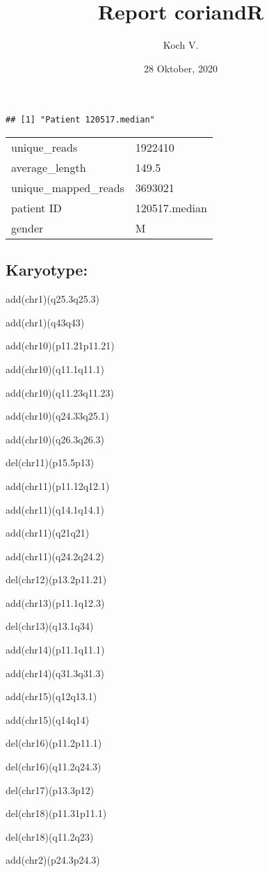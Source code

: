 \documentclass[]{article}
\title{Report coriandR}
\author{Koch V.}
\date{28 Oktober, 2020}
\begin{document}
\maketitle

\begin{verbatim}
## [1] "Patient 120517.median"
\end{verbatim}

\begin{longtable}[]{@{}ll@{}}
\toprule
\endhead
unique\_reads & 1922410\tabularnewline
average\_length & 149.5\tabularnewline
unique\_mapped\_reads & 3693021\tabularnewline
patient ID & 120517.median\tabularnewline
gender & M\tabularnewline
\bottomrule
\end{longtable}

\hypertarget{karyotype}{%
\subsection{Karyotype:}\label{karyotype}}

add(chr1)(q25.3q25.3)

add(chr1)(q43q43)

add(chr10)(p11.21p11.21)

add(chr10)(q11.1q11.1)

add(chr10)(q11.23q11.23)

add(chr10)(q24.33q25.1)

add(chr10)(q26.3q26.3)

del(chr11)(p15.5p13)

add(chr11)(p11.12q12.1)

add(chr11)(q14.1q14.1)

add(chr11)(q21q21)

add(chr11)(q24.2q24.2)

del(chr12)(p13.2p11.21)

add(chr13)(p11.1q12.3)

del(chr13)(q13.1q34)

add(chr14)(p11.1q11.1)

add(chr14)(q31.3q31.3)

add(chr15)(q12q13.1)

add(chr15)(q14q14)

del(chr16)(p11.2p11.1)

del(chr16)(q11.2q24.3)

del(chr17)(p13.3p12)

del(chr18)(p11.31p11.1)

del(chr18)(q11.2q23)

add(chr2)(p24.3p24.3)
\end{document}

